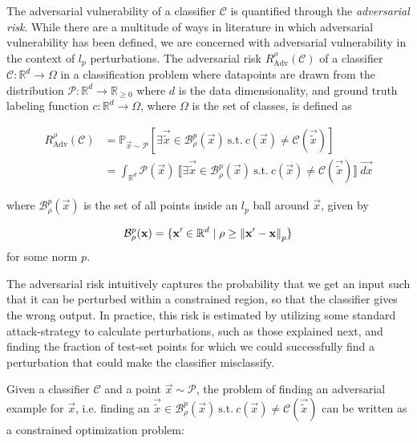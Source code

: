 \documentclass[12pt, oneside]{book}
\begin{document}
The adversarial vulnerability of a classifier $\mathcal{C}$ is quantified
through the \emph{adversarial risk}. While there are a multitude of ways in
literature in which adversarial vulnerability has been defined, we are concerned
with adversarial vulnerability in the context of $l_p$ perturbations. The
adversarial risk $R_{\text{Adv}}^{\rho}(\mathcal{C}) $ of a classifier
$\mathcal{C}: \mathbb{R}^d \to \Omega$ in a classification problem where
datapoints are drawn from the distribution $\mathcal{P}: \mathbb{R}^d \to
\mathbb{R}_{\geq 0}$ where $d$ is the data dimensionality, and ground truth
labeling function $c: \mathbb{R}^d \to \Omega$, where $\Omega$ is the set of
classes, is defined as

\begin{equation} \label{eq:adv-risk}
    \begin{split}
    R_{\text{Adv}}^{\rho}(\mathcal{C}) & = \mathbb{P}_{\vec{x} \sim \mathcal{P}}
    [\exists \vec{\tilde{x}} \in \mathcal{B}_\rho^p(\vec{x})~\text{s.t.}~c(\vec{x}) \neq \mathcal{C}(\vec{\tilde{x}})] \\
    & = \int_{\mathbb{R}^d} \mathcal{P}(\vec{x})
    ~\llbracket \exists \vec{\tilde{x}} \in \mathcal{B}_\rho^p(\vec{x})~\text{s.t.}~c(\vec{x}) \neq \mathcal{C}(\vec{\tilde{x}}) \rrbracket~\vec{dx}
    \end{split}
\end{equation}

where $\mathcal{B}_\rho^p(\vec{x})$ is the set of all points inside an $l_p$
ball around $\vec{x}$, given by 

\begin{equation*}
    \mathcal{B}_\rho^p({\mathbf{x}}) = \{{\mathbf{x'}} \in
    \mathbb{R}^d \mid \rho \geq \mathrm{\left\lVert{\mathbf{x'}} - {\mathbf{x}}\right\rVert}_p\}
\end{equation*}
for some norm $p$.

The adversarial risk intuitively captures the probability that we get an input
such that it can be perturbed within a constrained region, so that the
classifier gives the wrong output. In practice, this risk is estimated by
utilizing some standard attack-strategy to calculate perturbations, such as
those explained next, and finding the fraction of test-set points for which we
could successfully find a perturbation that could make the classifier
misclassify.

Given a classifier $\mathcal{C}$ and a point $\vec{x} \sim \mathcal{P}$, the
problem of finding an adversarial example for $\vec{x}$, i.e. finding an
$\vec{\tilde{x}} \in \mathcal{B}_\rho^p(\vec{x})~\text{s.t.}~c(\vec{x}) \neq
\mathcal{C}(\vec{\tilde{x}})$ can be written as a constrained optimization
problem:
\end{document}
